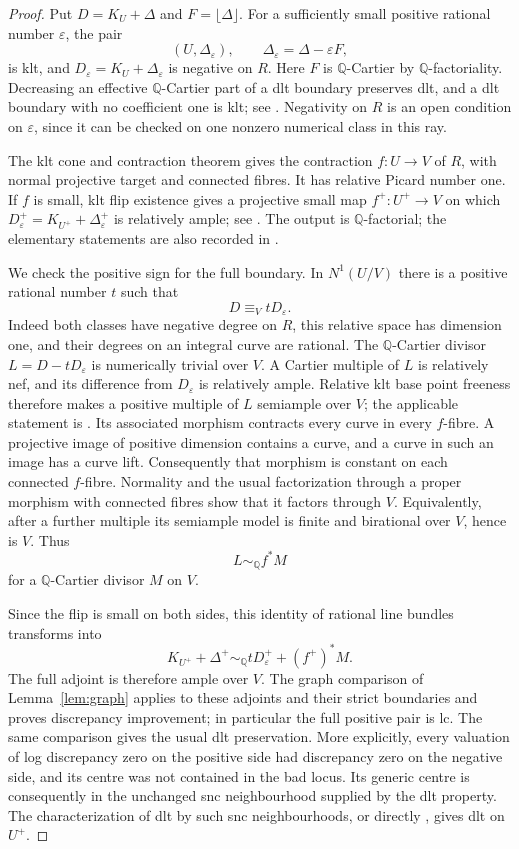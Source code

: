 \begin{proof}
Put $D=K_U+\Delta$ and $F=\lfloor\Delta\rfloor$.  For a sufficiently
small positive rational number $\varepsilon$, the pair
\[
  (U,\Delta_\varepsilon),\qquad
  \Delta_\varepsilon=\Delta-\varepsilon F,
\]
is klt, and $D_\varepsilon=K_U+\Delta_\varepsilon$ is negative on $R$.
Here $F$ is $\mathbb Q$-Cartier by $\mathbb Q$-factoriality.  Decreasing
an effective $\mathbb Q$-Cartier part of a dlt boundary preserves dlt,
and a dlt boundary with no coefficient one is klt; see
\cite[Corollary~2.39 and Proposition~2.41]{KM98}.  Negativity on $R$
is an open condition on $\varepsilon$, since it can be checked on one
nonzero numerical class in this ray.

The klt cone and contraction theorem gives the contraction
$f:U\to V$ of $R$, with normal projective target and connected fibres.
It has relative Picard number one.  If $f$ is small, klt flip existence
gives a projective small map $f^+:U^+\to V$ on which
$D_\varepsilon^+=K_{U^+}+\Delta_\varepsilon^+$ is relatively ample;
see \cite[Corollary~1.4.1]{BCHM}.  The output is
$\mathbb Q$-factorial; the elementary statements are also recorded in
\cite[Lemma~3.10.2]{BCHM}.

We check the positive sign for the full boundary.  In $N^1(U/V)$ there
is a positive rational number $t$ such that
\[
 D\equiv_V tD_\varepsilon.
\]
Indeed both classes have negative degree on $R$, this relative space
has dimension one, and their degrees on an integral curve are
rational.  The $\mathbb Q$-Cartier divisor
$L=D-tD_\varepsilon$ is numerically trivial over $V$.  A Cartier
multiple of $L$ is relatively nef, and its difference from
$D_\varepsilon$ is relatively ample.  Relative klt base point
freeness therefore makes a positive multiple of $L$ semiample over
$V$; the applicable statement is
\cite[Theorem~3.9.1]{BCHM}.  Its associated morphism contracts every
curve in every $f$-fibre.  A projective image of positive dimension
contains a curve, and a curve in such an image has a curve lift.
Consequently that morphism is constant on each connected $f$-fibre.
Normality and the usual factorization through a proper morphism with
connected fibres show that it factors through $V$.  Equivalently,
after a further multiple its semiample model is finite and
birational over $V$, hence is $V$.  Thus
\[
 L\sim_{\mathbb Q} f^*M
\]
for a $\mathbb Q$-Cartier divisor $M$ on $V$.

Since the flip is small on both sides, this identity of rational
line bundles transforms into
\[
 K_{U^+}+\Delta^+
   \sim_{\mathbb Q}tD_\varepsilon^++(f^+)^*M.
\]
The full adjoint is therefore ample over $V$.  The graph comparison
of Lemma~\ref{lem:graph} applies to these adjoints and their strict
boundaries and proves discrepancy improvement; in particular the
full positive pair is lc.  The same comparison gives the usual dlt
preservation.  More explicitly, every valuation of log discrepancy
zero on the positive side had discrepancy zero on the negative
side, and its centre was not contained in the bad locus.  Its generic
centre is consequently in the unchanged snc neighbourhood supplied
by the dlt property.  The characterization of dlt by such snc
neighbourhoods, or directly
\cite[Lemma~3.10.10(1)]{BCHM}, gives dlt on $U^+$.


\end{proof}
